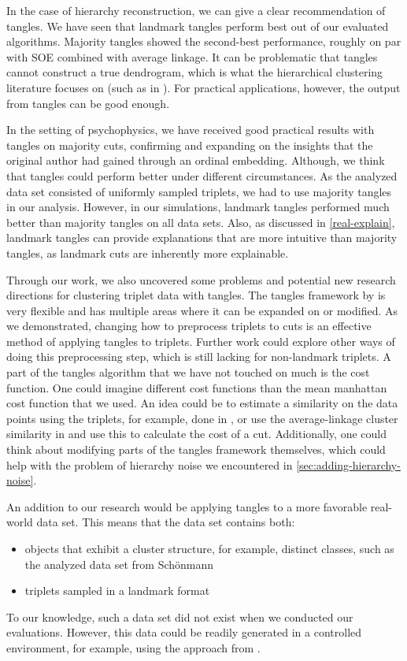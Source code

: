 In the case of hierarchy reconstruction, we can give a clear recommendation of tangles. We have seen that landmark tangles perform best out of our evaluated algorithms. Majority tangles 
showed the second-best performance, roughly on par with SOE combined with average linkage. 
It can be problematic that tangles cannot construct a true dendrogram, which is what the hierarchical clustering literature focuses on (such as in \cite{ghoshdastidarFoundationsComparisonBasedHierarchical2019}).  For practical applications, however, the output from tangles can be good enough. 

In the setting of psychophysics, we have received good practical results with tangles on majority cuts,
confirming and expanding on the insights that the original author had gained through an ordinal embedding. 
Although, we think that tangles could perform better under different circumstances.
As the analyzed data set consisted of uniformly sampled triplets, we had to use majority tangles in our analysis.
However, in our simulations, landmark tangles performed much better than majority tangles on all data sets.
Also, as discussed in \autoref{real-explain}, landmark tangles can provide explanations that are more intuitive than majority tangles, as landmark cuts are inherently more explainable. 

Through our work, we also uncovered some problems and potential new research directions for clustering triplet data with tangles. 
The tangles framework by \cite{klepperClusteringTanglesAlgorithmic2021} is very flexible and has multiple areas where it can be expanded on or modified. 
As we demonstrated, changing how to preprocess triplets to cuts is an effective method of applying tangles to triplets. 
Further work could explore other ways of doing this preprocessing step, which is still lacking for non-landmark triplets. 
A part of the tangles algorithm that we have not touched on much is the cost function. 
One could imagine different cost functions than the mean manhattan cost function that we used. An idea could be to estimate a similarity on the data points using the triplets, for example, done in 
\cite{kleindessnerKernelFunctionsBased2017}, or use the average-linkage cluster similarity in \cite{ghoshdastidarFoundationsComparisonBasedHierarchical2019} and use this to calculate the cost 
of a cut.
Additionally, one could think about modifying parts of the tangles framework themselves, which could help with the problem of 
hierarchy noise we encountered in \autoref{sec:adding-hierarchy-noise}.

An addition to our research would be applying tangles to a more favorable real-world data set. This means that the data set contains both:
\begin{itemize}
    \item objects that exhibit a cluster structure, for example, distinct classes, such as the analyzed data set from Schönmann
    \item triplets sampled in a landmark format
\end{itemize}
To our knowledge, such a data set did not exist when we conducted our evaluations. However, this data could be readily generated in a controlled environment, 
for example, using the approach from \cite{inesschonmannSimilarityJudgementsNatural2021}.
